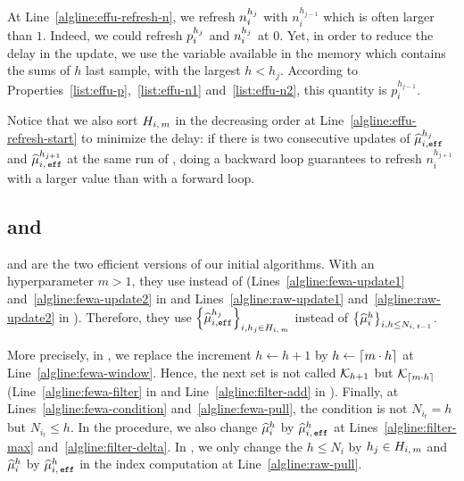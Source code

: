 \begin{remark}
At Line~\ref{algline:effu-refresh-n}, we refresh $n_i^{h_j}$ with $n_i^{h_{j-1}}$ which is often larger than $1$. Indeed, we could refresh $p_i^{h_j}$ and $n_i^{h_j}$ at $0$. Yet, in order to reduce the delay in the update, we use the variable available in the memory which contains the sums of $h$ last sample, with the largest $h< h_j$. According to Properties~\ref{list:effu-p},~\ref{list:effu-n1} and~\ref{list:effu-n2}, this quantity is $p_i^{h_{j-1}}$. 

Notice that we also sort $H_{i,\,m}$ in the decreasing order at Line~\ref{algline:effu-refresh-start} to minimize the delay: if there is two consecutive updates of $\widehat{\mu}_{i,\texttt{eff}}^{h_j}$ and $\widehat{\mu}_{i,\, \texttt{eff}}^{h_{j+1}}$ at the same run of \EFF, doing a backward loop guarantees to refresh $n_i^{h_{j+1}}$ with a larger value than with a forward loop. 
\end{remark}


\subsection{{\EFFFEWA} and {\EFFRAW}}
{\EFFFEWA} and {\EFFRAW} are the two efficient versions of our initial algorithms. With an hyperparameter $m>1$, they use \EFF instead of \UPDATE (Lines~\ref{algline:fewa-update1} and~\ref{algline:fewa-update2} in \FEWA and Lines~\ref{algline:raw-update1} and~\ref{algline:raw-update2} in \RUCB). Therefore, they use $\left\{\widehat{\mu}_{i,\texttt{eff}}^{h_j}\right\}_{i,h_j\in H_{i,\,m}}$ instead of $\left\{\widehat{\mu}_i^h\right\}_{i,h \leq N_{i,\,t-1}}$. 

More precisely, in \FEWA, we replace the increment $h\gets h+1$ by $h\gets\left\lceil m\cdot h\right\rceil$ at Line~\ref{algline:fewa-window}. Hence, the next set is not called $\mathcal{K}_{h+1}$ but $\mathcal{K}_{\left\lceil m\cdot h\right\rceil}$ (Line~\ref{algline:fewa-filter} in \FEWA and Line~\ref{algline:filter-add} in \FILTER). Finally, at Lines~\ref{algline:fewa-condition} and~\ref{algline:fewa-pull}, the condition is not $N_{i_t}=h$ but $N_{i_t} \leq h$. In the \FILTER procedure, we also change $\widehat{\mu}_i^h$ by $\widehat{\mu}_{i,\,\texttt{eff}}^h$ at Lines~\ref{algline:filter-max} and~\ref{algline:filter-delta}. In \RUCB, we only change the $h\leq N_i$ by $h_j \in H_{i,\,m}$ and $\widehat{\mu}_i^h$ by $\widehat{\mu}_{i,\,\texttt{eff}}^h$ in the index computation at Line~\ref{algline:raw-pull}.

